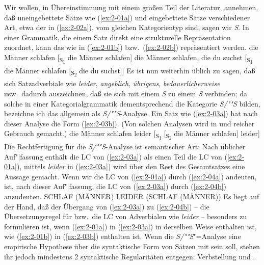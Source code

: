 \documentclass[output=paper]{langsci/langscibook}
\begin{document}
Wir wollen, in Übereinstimmung mit einem großen Teil der Literatur, annehmen, daß uneingebettete Sätze wie (\ref{ex:2-01a}) und eingebettete Sätze verschiedener Art, etwa der  in (\ref{ex:2-02a}), vom gleichen Kategorientyp sind, sagen wir \textit{S}. In einer Grammatik, die einem Satz direkt eine strukturelle Repräsentation zuordnet, kann das wie in (\ref{ex:2-01b}) bzw.\ (\ref{ex:2-02b}) repräsentiert werden.
\eal
	\ex \label{ex:2-01a} die Männer schlafen
	\ex \label{ex:2-01b} [\textsubscript{S\textsubscript{1}} die Männer schlafen]
\zl
\eal
	\ex \label{ex:2-02a} die Männer schlafen, die du suchst
	\ex \label{ex:2-02b} [\textsubscript{S\textsubscript{1}} die Männer schlafen [\textsubscript{S\textsubscript{2}} die du suchst]]
\zl
\addlines
Es ist nun weiterhin üblich zu sagen, daß sich Satzadverbiale wie \textit{leider}, \textit{angeblich}, \textit{übrigens}, \textit{bedauerlicherweise} usw.\  dadurch auszeichnen, daß sie sich mit einem \textit{S} zu einem \textit{S} verbinden; da solche  in einer Kategorialgrammatik dementsprechend die Kategorie \textit{S/""S} bilden, bezeichne ich das allgemein als \textit{S/""S}-Analyse. Ein Satz wie (\ref{ex:2-03a}) hat nach dieser Analyse die Form (\ref{ex:2-03b}). (Von solchen Analysen wird \zb in \citet{Eisenberg75} und \citet{Eisenberg76} reicher Gebrauch gemacht.)
\eal
	\ex \label{ex:2-03a} die Männer schlafen leider
	\ex \label{ex:2-03b} [\textsubscript{S\textsubscript{1}} [\textsubscript{S\textsubscript{2}} die Männer schlafen] leider]
\zl
Die Rechtfertigung für die \textit{S/""S}-Analyse ist semantischer Art: Nach üblicher Auf"|fassung enthält die LC von (\ref{ex:2-03a}) als einen Teil die LC von (\ref{ex:2-01a}), \dash mittels \textit{leider} in (\ref{ex:2-03a}) wird über den Rest des Gesamtsatzes eine Aussage gemacht. Wenn wir die LC von (\ref{ex:2-01a}) durch (\ref{ex:2-04a}) andeuten, ist, nach dieser Auf"|fassung, die LC von (\ref{ex:2-03a}) durch (\ref{ex:2-04b}) anzudeuten.
\eal \label{ex:2-04}
	\ex \label{ex:2-04a} SCHLAF (MÄNNER)
	\ex \label{ex:2-04b} LEIDER (SCHLAF (MÄNNER))
\zl
Es liegt auf der Hand, daß der Übergang von (\ref{ex:2-03a}) zu (\ref{ex:2-04b}) -- \dash die Übersetzungsregel für bzw.\ die LC von Adverbialen wie \textit{leider} -- besonders  zu formulieren ist, wenn (\ref{ex:2-01a}) in (\ref{ex:2-03a}) in derselben Weise enthalten ist, wie (\ref{ex:2-01b}) in (\ref{ex:2-03b}) enthalten ist. Wenn die \textit{S/""S}"=Analyse eine empirische Hypothese über die syntaktische Form von Sätzen mit  sein soll, stehen ihr jedoch mindestens 2 syntaktische Regularitäten entgegen: Verbstellung und .
\end{document}
